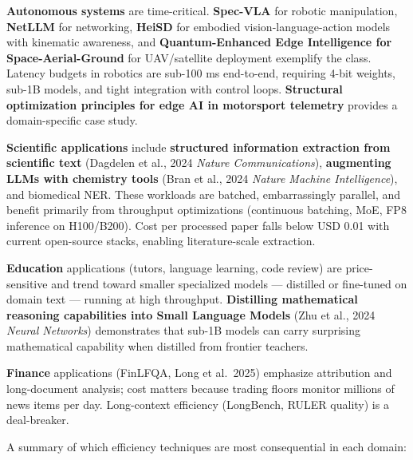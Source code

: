\documentclass{article}
\begin{document}
\textbf{Autonomous systems} are time-critical. \textbf{Spec-VLA} for robotic manipulation, \textbf{NetLLM} \citep{wu20242024} for networking, \textbf{HeiSD} \citep{zheng20252025} for embodied vision-language-action models with kinematic awareness, and \textbf{Quantum-Enhanced Edge Intelligence for Space-Aerial-Ground} \citep{gupta2026quantumenhancededg} for UAV/satellite deployment exemplify the class. Latency budgets in robotics are sub-100 ms end-to-end, requiring 4-bit weights, sub-1B models, and tight integration with control loops. \textbf{Structural optimization principles for edge AI in motorsport telemetry} \citep{cdiz2026structuraloptimiza} provides a domain-specific case study.

\textbf{Scientific applications} include \textbf{structured information extraction from scientific text} (Dagdelen et al., 2024 \emph{Nature Communications}), \textbf{augmenting LLMs with chemistry tools} (Bran et al., 2024 \emph{Nature Machine Intelligence}), and biomedical NER. These workloads are batched, embarrassingly parallel, and benefit primarily from throughput optimizations (continuous batching, MoE, FP8 inference on H100/B200). Cost per processed paper falls below USD 0.01 with current open-source stacks, enabling literature-scale extraction.

\textbf{Education} applications (tutors, language learning, code review) are price-sensitive and trend toward smaller specialized models --- distilled or fine-tuned on domain text --- running at high throughput. \textbf{Distilling mathematical reasoning capabilities into Small Language Models} (Zhu et al., 2024 \emph{Neural Networks}) demonstrates that sub-1B models can carry surprising mathematical capability when distilled from frontier teachers.

\textbf{Finance} applications (FinLFQA, Long et al.~2025) emphasize attribution and long-document analysis; cost matters because trading floors monitor millions of news items per day. Long-context efficiency (LongBench, RULER quality) is a deal-breaker.

A summary of which efficiency techniques are most consequential in each domain:
\end{document}
